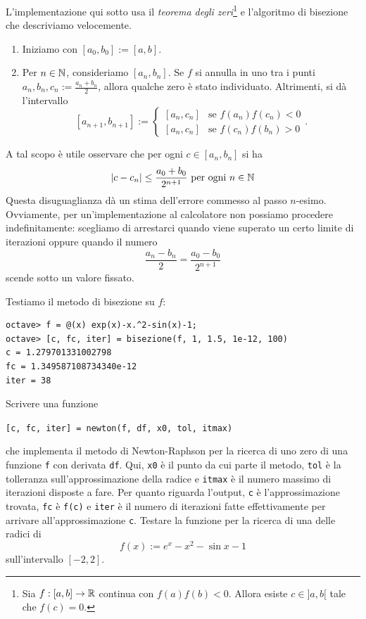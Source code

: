 L'implementazione qui sotto usa il {\em teorema degli zeri}\footnote{Sia \(f : [a, b] \to \mathbb R\) continua con \(f(a)f(b) < 0\). Allora esiste \(c \in ]a, b[\) tale che \(f(c) = 0\).} e l'algoritmo di bisezione che descriviamo velocemente.
\begin{enumerate}
\item Iniziamo con \([a_0, b_0] := [a, b]\).
\item Per \(n \in \mathbb N\), consideriamo \([a_n, b_n]\). Se \(f\) si annulla in uno tra i punti \(a_n, b_n, c_n := \frac{a_n+b_n}{2}\), allora qualche zero è stato individuato. Altrimenti, si dà l'intervallo
\[[a_{n+1}, b_{n+1}] := \begin{cases} [a_n, c_n] & \text{se } f(a_n)f(c_n) < 0 \\ [a_n, c_n] & \text{se } f(c_n)f(b_n) > 0 \end{cases}.\]
\end{enumerate}
A tal scopo è utile osservare che per ogni \(c \in [a_n, b_n]\) si ha 
\[\lvert c-c_n \rvert \le \frac{a_0+b_0}{2^{n+1}} \text{ per ogni } n \in \mathbb N\]
Questa disuguaglianza dà un stima dell'errore commesso al passo \(n\)-esimo. Ovviamente, per un'implementazione al calcolatore non possiamo procedere indefinitamente: scegliamo di arrestarci quando viene superato un certo limite di iterazioni oppure quando il numero
\[\frac{a_n-b_n}{2} = \frac{a_0-b_0}{2^{n+1}}\]
scende sotto un valore fissato.



Testiamo il metodo di bisezione su \(f\):

\begin{lstlisting}[numbers=none]
octave> f = @(x) exp(x)-x.^2-sin(x)-1;
octave> [c, fc, iter] = bisezione(f, 1, 1.5, 1e-12, 100)
c = 1.279701331002798
fc = 1.349587108734340e-12
iter = 38
\end{lstlisting}


\begin{esercizio}
Scrivere una funzione
\begin{center}
\lstinline£[c, fc, iter] = newton(f, df, x0, tol, itmax)£
\end{center}
che implementa il metodo di \textenglish{Newton-Raphson} per la ricerca di uno zero di una funzione \lstinline£f£ con derivata \lstinline£df£. Qui, \lstinline£x0£ è il punto da cui parte il metodo, \lstinline£tol£ è la tolleranza sull'approssimazione della radice e \lstinline£itmax£ è il numero massimo di iterazioni disposte a fare. Per quanto riguarda l'output, \lstinline£c£ è l'approssimazione trovata, \lstinline£fc£ è \lstinline£f(c)£ e \lstinline£iter£ è il numero di iterazioni fatte effettivamente per arrivare all'approssimazione \lstinline£c£. Testare la funzione per la ricerca di una delle radici di
\[f(x) := e^x - x^2 - \sin x - 1\]
sull'intervallo \([-2, 2]\).
\end{esercizio}

